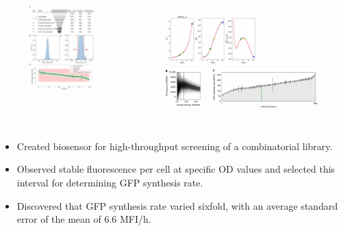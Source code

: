\documentclass{beamer}
\begin{document}
\begin{frame}{}
		\begin{columns}
	    \begin{figure}
		\centering
		\includegraphics[width=3cm]{pic/图片14.pdf}
  
 	    \end{figure}
	    \begin{figure}
		\flushleft
            \includegraphics[width=3.6cm]{pic/图片13.pdf}\\
		\includegraphics[width=7cm]{pic/图片15.pdf}
 	    \end{figure}
        \end{columns}

    \begin{itemize} [<+-| alert@+>] %
        \item\scriptsize Created biosensor for high-throughput screening of a combinatorial library.
        \item\scriptsize  Observed stable fluorescence per cell at specific OD values and selected this interval for determining GFP synthesis rate.
        \item\scriptsize Discovered that GFP synthesis rate varied sixfold, with an average standard error of the mean of 6.6 MFI/h.
    \end{itemize} 
\end{frame}
\end{document}
